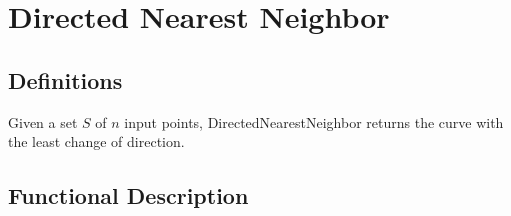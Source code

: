   \section{Directed Nearest Neighbor}
  \label{sec:directed_nearest_neighbor}

    \subsection{Definitions}
    \label{sub:definitions}
      \begin{definition}
          Given a set $S$ of $n$ input points, DirectedNearestNeighbor returns the curve with the least change of direction.
      \end{definition}

    \subsection{Functional Description}
    \label{sub:functional_description}
      
